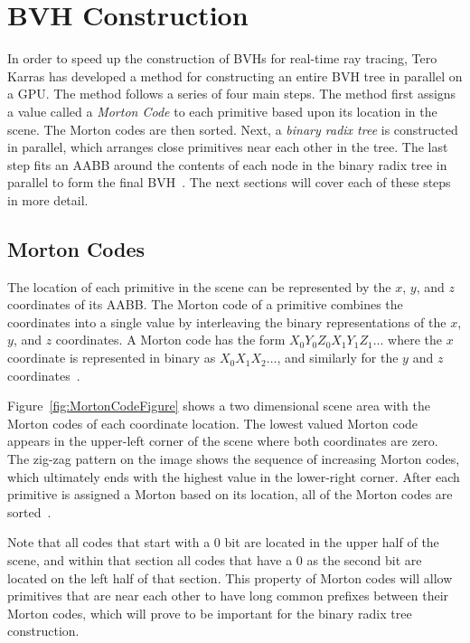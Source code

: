 \documentclass{sig-alternate}
\begin{document}

\section{BVH Construction}
\label{sec:bvh}

In order to speed up the construction of BVHs for real-time ray tracing, Tero Karras has developed a method for constructing an entire BVH tree in parallel on a GPU. The method follows a series of four main steps. The method first assigns a value called a \emph{Morton Code} to each primitive based upon its location in the scene. The Morton codes are then sorted. Next, a \emph{binary radix tree} is constructed in parallel, which arranges close primitives near each other in the tree. The last step fits an AABB around the contents of each node in the binary radix tree in parallel to form the final BVH~\cite{Karras:2013}. The next sections will cover each of these steps in more detail.

\subsection{Morton Codes}
\label{sec:mortonCodes}

The location of each primitive in the scene can be represented by the $x$, $y$, and $z$ coordinates of its AABB. The Morton code of a primitive combines the coordinates into a single value by interleaving the binary representations of the $x$, $y$, and $z$ coordinates. A Morton code has the form \begin{math}X_{0}Y_{0}Z_{0}X_{1}Y_{1}Z_{1}\dots\end{math} where the $x$ coordinate is represented in binary as \begin{math}X_{0}X_{1}X_{2}\dots\end{math}, and similarly for the $y$ and $z$ coordinates~\cite{Karras:2012}.

Figure~\ref{fig:MortonCodeFigure} shows a two dimensional scene area with the Morton codes of each coordinate location. The lowest valued Morton code appears in the upper-left corner of the scene where both coordinates are zero. The zig-zag pattern on the image shows the sequence of increasing Morton codes, which ultimately ends with the highest value in the lower-right corner. After each primitive is assigned a Morton based on its location, all of the Morton codes are sorted~\cite{Karras:2012}.

Note that all codes that start with a 0 bit are located in the upper half of the scene, and within that section all codes that have a 0 as the second bit are located on the left half of that section. This property of Morton codes will allow primitives that are near each other to have long common prefixes between their Morton codes, which will prove to be important for the binary radix tree construction.
\end{document}
